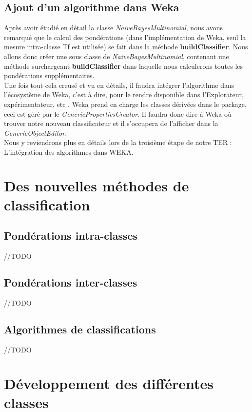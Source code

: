 \documentclass{article}
\begin{document}
\subsection{Ajout d'un algorithme dans Weka}\label{sec:algoW}
Après avoir étudié en détail la classe \textit{NaiveBayesMultinomial}, nous avons remarqué que le calcul des pondérations (dans l'implémentation de Weka, seul la mesure intra-classe Tf est utilisée) se fait dans la méthode \textbf{buildClassifier}. Nous allons donc créer une sous classe de \textit{NaiveBayesMultinomial}, contenant une méthode surchargeant \textbf{buildClassifier} dans laquelle nous calculerons toutes les pondérations supplémentaires.\\
Une fois tout cela creusé et vu en détails, il faudra intégrer l'algorithme dans l'écosystème de Weka, c'est à dire, pour le rendre disponible dans l'Explorateur, expérimentateur, etc . 
Weka prend en charge les classes dérivées dans le package, ceci est géré par le \textit{GenericPropertiesCreator}. Il faudra donc dire à Weka où trouver notre nouveau classificateur et il s'occupera de l'afficher dans la \textit{GenericObjectEditor}.\\
Nous y reviendrons plus en détails lors de la troisième étape de notre TER : L'intégration des algorithmes dans WEKA.
\section{Des nouvelles méthodes de classification}

\subsection{Pondérations intra-classes}
//TODO
\subsection{Pondérations inter-classes}
//TODO
\subsection{Algorithmes de classifications}
//TODO



\section{Développement des différentes classes}\label{sec:classes}
\end{document}
